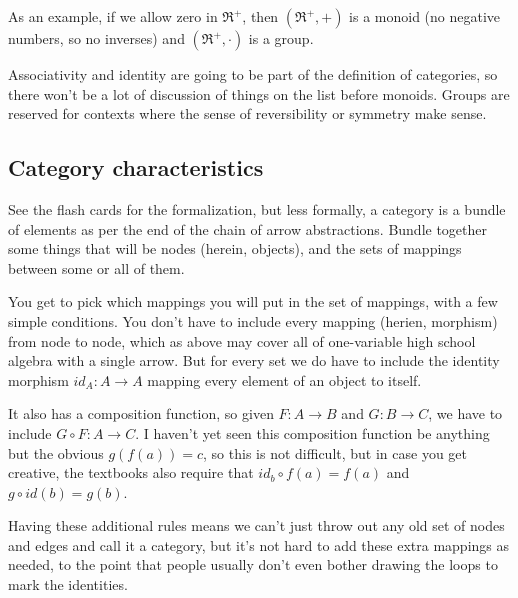 \documentclass[11pt]{article}
\begin{document}

As an example, if we allow zero in $\Re^+$, then $(\Re^+, +)$ is a monoid (no negative numbers, so
no inverses) and $(\Re^+, \cdot)$ is a group.

Associativity and identity are going to be part of the definition of categories,
so there won't be a lot of discussion of things on the list before monoids.
Groups are reserved for contexts where the sense of reversibility or symmetry make sense.

\subsection{Category characteristics}
See the flash cards for the formalization, but less formally,
a category is a bundle of elements as per the end of the chain of arrow abstractions. Bundle
together some things that will be nodes (herein, objects),
and the sets of mappings between some or all of them.

You get to pick which mappings you will put in the set of mappings, with a few simple conditions.
You don't have to include every mapping (herien, morphism) from node to node, which as above may cover all of one-variable high school algebra with a single arrow. But for every set we do have to include
the identity morphism $id_A:A\to A$ mapping every element of an object to itself.

It also has a composition function, so given $F:A\to B$
and $G:B\to C$, we have to include $G\circ F:A\to C$. I haven't yet seen this composition
function be anything but the obvious $g(f(a)) = c$, so this is not difficult, but in case
you get creative, the textbooks also require that $id_b\circ f(a)=f(a)$ and $g\circ id(b) = g(b)$.

Having these additional rules means we can't just throw out any old set of nodes and edges
and call it a category, but it's not hard to add these extra mappings as needed,
to the point that people usually don't even bother drawing the loops to mark the
identities.
\end{document}
